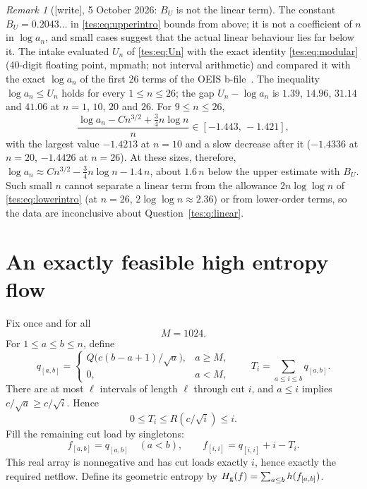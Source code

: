 \documentclass[11pt,a4paper]{article}
\theoremstyle{remark}\newtheorem{remark}[theorem]{Remark}
\newcommand{\Hg}{H_{\rm g}}\newcommand{\floor}[1]{\left\lfloor#1\right\rfloor}
\numberwithin{equation}{section}
\begin{document}
\begin{remark}[{[write]}, 5 October 2026: $B_U$ is not the linear term]\label{tes:rem:linear}
The constant $B_U=0.2043\ldots$ in \eqref{tes:eq:upperintro} bounds from
above; it is not a coefficient of $n$ in $\log a_n$, and small cases suggest
that the actual linear behaviour lies far below it. The intake evaluated
$U_n$ of \eqref{tes:eq:Un} with the exact identity \eqref{tes:eq:modular}
(40-digit floating point, \textsf{mpmath}; not interval arithmetic) and
compared it with the exact $\log a_n$ of the first 26 terms of the OEIS
b-file~\cite{oeis}. The inequality $\log a_n\le U_n$ holds for every
$1\le n\le26$; the gap $U_n-\log a_n$ is $1.39$, $14.96$, $31.14$ and
$41.06$ at $n=1$, $10$, $20$ and $26$. For $9\le n\le26$,
\[
\frac{\log a_n-Cn^{3/2}+\frac34n\log n}{n}\in[-1.443,\,-1.421],
\]
with the largest value $-1.4213$ at $n=10$ and a slow decrease after it
($-1.4336$ at $n=20$, $-1.4426$ at $n=26$). At these sizes, therefore,
$\log a_n\approx Cn^{3/2}-\frac34n\log n-1.4\,n$, about $1.6\,n$ below the
upper estimate with $B_U$. Such small $n$ cannot separate a linear term from
the allowance $2n\log\log n$ of \eqref{tes:eq:lowerintro} (at $n=26$,
$2\log\log n\approx2.36$) or from lower-order terms, so the data are
inconclusive about Question~\ref{tes:q:linear}.
\end{remark}

\section{An exactly feasible high entropy flow}\label{tes:sec:feasible}
Fix once and for all
\begin{equation}\label{tes:eq:cutoff}
M=1024.
\end{equation}
For $1\le a\le b\le n$, define
\begin{equation}\label{tes:eq:q}
q_{[a,b]}=\begin{cases}
Q\bigl(c(b-a+1)/\sqrt a\bigr),&a\ge M,\\
0,&a<M,
\end{cases}
\qquad T_i=\sum_{a\le i\le b}q_{[a,b]}.
\end{equation}
There are at most $\ell$ intervals of length $\ell$ through cut $i$, and $a\le i$ implies $c/\sqrt a\ge c/\sqrt i$. Hence
\begin{equation}\label{tes:eq:Tbound}
0\le T_i\le R(c/\sqrt i)\le i.
\end{equation}
Fill the remaining cut load by singletons:
\begin{equation}\label{tes:eq:f}
f_{[a,b]}=q_{[a,b]}\quad(a<b),\qquad
f_{[i,i]}=q_{[i,i]}+i-T_i.
\end{equation}
This real array is nonnegative and has cut loads exactly $i$, hence exactly the required netflow. Define its geometric entropy by
$\Hg(f)=\sum_{a\le b}h(f_{[a,b]})$.
\end{document}
